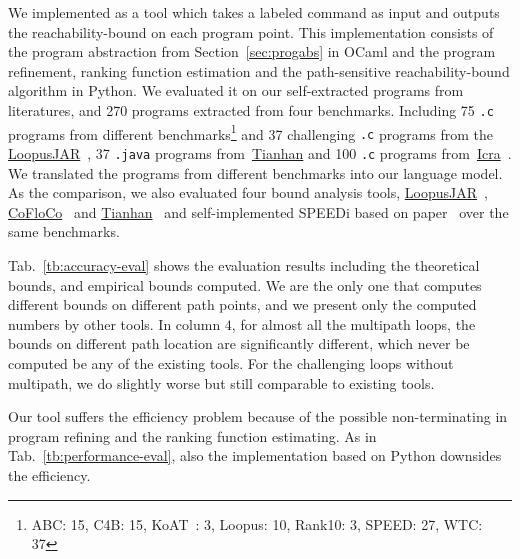 We implemented {\THESYSTEM} as a tool which takes a labeled command as input  
and outputs the reachability-bound on each program point.
This implementation consists of the 
program abstraction from Section~\ref{sec:progabs} in OCaml and the program refinement, ranking function estimation and the path-sensitive reachability-bound algorithm in Python.
We evaluated it on our self-extracted programs from literatures, and 270 programs extracted from four benchmarks. 
Including 75 {\tt .c} programs from different benchmarks\footnote{ABC: 15, C4B: 15, KoAT~\cite{BrockschmidtEFFG14,FalkeKS12,FalkeKS11}: 3, Loopus: 10, Rank10: 3, SPEED: 27, WTC: 37} and 37 challenging {\tt .c} programs 
from the \hyperlink{https://forsyte.at/static/people/sinn/loopusJAR/index.html}{LoopusJAR}~\cite{SinnZV17},
37 {\tt .java} programs from~\hyperlink{https://zenodo.org/record/5140586\#.Y5pBoC-B1QI}{Tianhan}\cite{LuCT21}
and 100 {\tt .c} programs from~\hyperlink{https://github.com/icra-team/icra}{Icra}~\cite{KincaidBCR19,CyphertBKR19}.
We translated the programs from different benchmarks into our language model.
As the comparison, we also evaluated four bound analysis tools, 
\hyperlink{https://forsyte.at/software/loopus/}{LoopusJAR}~\cite{SinnZV17},
\hyperlink{https://github.com/aeflores/CoFloCo/tree/master/src}{CoFloCo}~\cite{Montoya17,Flores-Montoya16,Flores-MontoyaH14}
and \hyperlink{https://zenodo.org/record/5140586\#.Y5pBoC-B1QI}{Tianhan}~\cite{LuCT21}
and self-implemented SPEEDi based on paper~\cite{GulwaniJK09}
over the same benchmarks.


Tab.~\ref{tb:accuracy-eval} shows the evaluation results including the theoretical bounds, and empirical bounds computed.
We are the only one that computes different bounds on different path points,
and we present only the computed numbers by other tools. In column $4$, for almost all the multipath loops, the bounds on different path location are significantly different, which never be computed be any of the existing tools.
For the challenging loops without multipath, we do slightly worse but still comparable to existing tools.

Our tool suffers the efficiency problem because of the possible non-terminating in program refining and the ranking function estimating.
As in Tab.~\ref{tb:performance-eval}, also the implementation based on Python downsides the efficiency.

